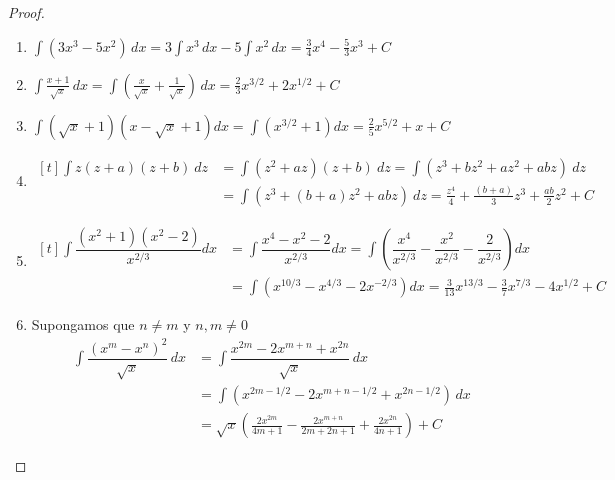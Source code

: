 \begin{proof}
\begin{enumerate}
\item  $\displaystyle\int (3x^3-5x^2)\,dx = 3\displaystyle\int x^3 \,dx -5\displaystyle\int x^2\,dx = \frac{3}{4}x^4-\frac{5}{3}x^3+C$ \\
\item $\displaystyle\int \frac{x+1}{\sqrt{x}}\,dx  =\displaystyle\int \left( \frac{x}{\sqrt{x}}+\frac{1}{\sqrt{x}}\right) \,dx = \frac{2}{3}x^{3/2}+2x^{1/2}+C
$ \\
\item $\displaystyle\int (\sqrt{x}+1)(x-\sqrt{x}+1)dx  =\displaystyle\int( x^{3/2}+1)dx  = \frac{2}{5}x^{5/2}+x+C $ \\
\item   $\begin{aligned}[t]
\displaystyle\int  z(z+a)(z+b) \ dz &=\displaystyle\int   (z^2+az)(z+b) \ dz =\displaystyle\int   (z^3 +bz^2 +az^2+abz) \ dz \\
  &=\displaystyle\int   (z^3 +(b+a)z^2+abz) \ dz =\frac{z^4}{4}+\frac{(b+a)}{3}z^{3}+\frac{ab}{2}z^2+C
 \end{aligned}$ \\
\item $\begin{aligned}[t] \displaystyle\int \dfrac{(x^2+1)(x^2-2)}{x^{2/3}} dx &= \displaystyle\int \dfrac{x^4 -x^2-2}{x^{2/3}}dx =\displaystyle\int \left(\dfrac{x^4}{x^{2/3}}  -\dfrac{x^2}{x^{2/3}}  -\dfrac{2}{x^{2/3}} \right)dx \\
 &= \displaystyle\int \left( x^{10/3}  -x^{4/3}  - 2x^{-2/3} \right)dx  =\frac{3}{13}x^{13/3} -\frac{3}{7}x^{7/3}-4x^{1/2}+C \end{aligned}$
 \item Supongamos que $n \neq m$ y $n,m \neq 0$
\begin{align*}
 \displaystyle\int \dfrac{(x^m  -x^n)^2}{\sqrt{x}}\,dx &=\displaystyle\int \dfrac{ x^{2m}-2x^{m+n}+x^{2n} }{\sqrt{x}}\,dx \\
 &  =\displaystyle\int  \left( x^{2m-1/2}-2x^{m+n-1/2}+x^{2n-1/2} \right) \,dx \\
 &=\sqrt{x}\left( \frac{2x^{2m}}{4m+1}-\frac{2x^{m+n}}{2m+2n+1}+\frac{2x^{2n}}{ 4n+1  }\right)+C
\end{align*} 
\end{enumerate}
\end{proof}
\\
\newpage


